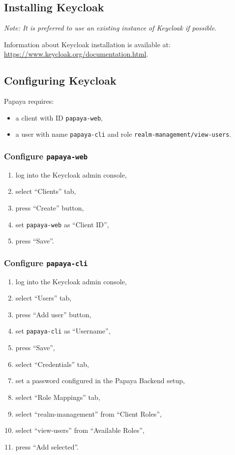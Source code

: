 \subsection{Installing Keycloak}\label{subsec:installing-keycloak}

\emph{Note: It is preferred to use an existing instance of Keycloak
if possible.}

Information about Keycloak installation is available at:
\url{https://www.keycloak.org/documentation.html}.


\subsection{Configuring Keycloak}\label{subsec:configuring-keycloak}

Papaya requires:
\begin{itemize}
    \item a client with ID \texttt{papaya-web},
    \item a user with name \texttt{papaya-cli}
    and role \texttt{realm-management/view-users}.
\end{itemize}

\subsubsection*{Configure \texttt{papaya-web}}

\begin{enumerate}
    \setlength\itemsep{0em}
    \item log into the Keycloak admin console,
    \item select ``Clients'' tab,
    \item press ``Create'' button,
    \item set \texttt{papaya-web} as ``Client ID'',
    \item press ``Save''.
\end{enumerate}

\subsubsection*{Configure \texttt{papaya-cli}}

\begin{enumerate}
    \setlength\itemsep{0em}
    \item log into the Keycloak admin console,
    \item select ``Users'' tab,
    \item press ``Add user'' button,
    \item set \texttt{papaya-cli} as ``Username'',
    \item press ``Save'',
    \item select ``Credentials'' tab,
    \item set a password configured in the Papaya Backend setup,
    \item select ``Role Mappings'' tab,
    \item select ``realm-management'' from ``Client Roles'',
    \item select ``view-users'' from ``Available Roles'',
    \item  press ``Add selected''.
\end{enumerate}
